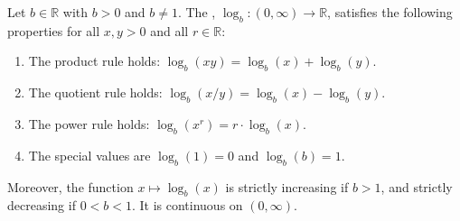 \begin{proposition} \label{proposition:properties_of_real_logarithm_functions}
    Let $b \in \mathbb{R}$ with $b > 0$ and $b \neq 1$. The , $\log_b : (0, \infty) \to \mathbb{R}$, satisfies the following properties for all $x, y > 0$ and all $r \in \mathbb{R}$:
    \begin{enumerate}
        \item The product rule holds: $\log_b(xy) = \log_b(x) + \log_b(y)$.
        \item The quotient rule holds: $\log_b(x/y) = \log_b(x) - \log_b(y)$.
        \item The power rule holds: $\log_b(x^r) = r \cdot \log_b(x)$.
        \item The special values are $\log_b(1) = 0$ and $\log_b(b) = 1$.
    \end{enumerate}
    Moreover, the function $x \mapsto \log_b(x)$ is strictly increasing if $b > 1$, and strictly decreasing if $0 < b < 1$. It is continuous on $(0, \infty)$.
\end{proposition}
